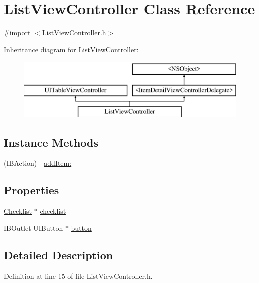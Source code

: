 \hypertarget{interface_list_view_controller}{\section{List\-View\-Controller Class Reference}
\label{interface_list_view_controller}
}


{\ttfamily \#import $<$List\-View\-Controller.\-h$>$}

Inheritance diagram for List\-View\-Controller\-:\begin{figure}[H]
\begin{center}
\leavevmode
\includegraphics[height=3.000000cm]{interface_list_view_controller}
\end{center}
\end{figure}
\subsection*{Instance Methods}
\begin{DoxyCompactItemize}
\item 
(I\-B\-Action) -\/ \hyperlink{interface_list_view_controller_a3d67372599a615e6f17c6b7b5bca9f55}{add\-Item\-:}
\end{DoxyCompactItemize}
\subsection*{Properties}
\begin{DoxyCompactItemize}
\item 
\hyperlink{interface_checklist}{Checklist} $\ast$ \hyperlink{interface_list_view_controller_ad44afb267936983c269c2eaed00ee892}{checklist}
\item 
I\-B\-Outlet U\-I\-Button $\ast$ \hyperlink{interface_list_view_controller_a2214ade0373025b59c76f903e0780caa}{button}
\end{DoxyCompactItemize}


\subsection{Detailed Description}


Definition at line 15 of file List\-View\-Controller.\-h.



